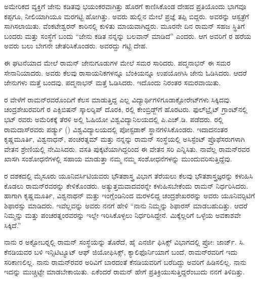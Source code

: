 ಅಮೇರಿಕದ ವ್ಯಕ್ತಿಗೆ ಜೇನು ಕಡಿತವು ಭಯಂಕರವಾಗಿತ್ತು ಹೊರಗೆ ಕಾಣಿಸಿಕೊಂಡ ದೇಹದ ಪ್ರತಿಯೊಂದು ಭಾಗವೂ ಕಪ್ಪಗೂ, ನೀಲಿಯಾಗಿಯೂ ಮರಗಟ್ಟಿ ಹೋಗಿತ್ತು. ಅವರು ಹುಲ್ಲಿನ ಮೇಲೆ ಪ್ರಜ್ಞೆ ತಪ್ಪಿ ಬಿದ್ದರು. ಅವರನ್ನು ಆಸ್ಪತ್ರೆಗೆ ಸಾಗಿಸಲಾಯಿತು. ವೆಂಕಟೇಶ್ವರನ್ ಕಾರಿನಲ್ಲಿ ಕುಳಿತು ಮಾಯವಾಗಿದ್ದರು. ಮೂರನೇ ದಿನ ರಾಮನ್ ಸಹಜ ಸ್ಥಿತಿಗೆ ಬಂದರು ಮತ್ತು ಸಂಸ್ಥೆಗೆ ಬಂದು “ಜೇನು ಕಡಿತ ನನ್ನನ್ನು ಬಲವಾನ್ ಮಾಡಿದೆ” ಎಂದರು. ಆಗ ಅವರಿಗೆ ರ ಹರೆಯ ಅವರು ಬಲು ಬೇಗನೇ ಚೇತರಿಸಿಕೊಂಡರು. ಅವರದ್ದು ಗಟ್ಟಿ ದೇಹ.

ಈ ಘಟನೆಯಾದ ಮೇಲೆ ರಾಮನ್ ಜೇನುಗೂಡುಗಳ ಮೇಲೆ ಸಮರ ಸಾರಿದರು. ಪದ್ಮನಾಭನ್ ಈ ಸಮರ ಸೇನಾನಿಯಾದರು. ಅವರು ಕೆಲವು ರಾಸಾಯನಿಕಗಳನ್ನೂ ಬೆಂಕಿಯನ್ನೂ ಉಪಯೋಗಿಸಿ ಜೇನು ಓಡಿಸಿದರು. ಆದರೆ ಜೇನುಗಳು ಮತ್ತೆ ಬಂದವು. ಪದ್ಮನಾಭನ್ ಮತ್ತೆ ಓಡಿಸಿದರು. ಇದೊಂದು ನಿರಂತರ ಸಮರವಾಯಿತು.



ರ ವೇಳೆಗೆ ರಾಮನ್‍ರವರೊಂದಿಗೆ ಕೆಲಸ ಮಾಡುತ್ತಿದ್ದ ಎಲ್ಲ ವಿದ್ಯಾರ್ಥಿಗಳಿಗೂ\break ಡಾಕ್ಟೋರೇಟ್‍ಗಳು ಸಿಕ್ಕಿದವು. ಚಂದ್ರಶೇಖರವರಿಗೆ ರ ಎಕ್ಸಿಬಿಷನ್ ಸ್ಕಾಲರ್‍ಶಿಪ್ ದೊರಕಿ, ರಲ್ಲಿ ಕೇಂಬ್ರಿಡ್ಜ್‌ಗೆ ಹೊರಟರು. ಫುಲ್‍ಬ್ರೈಟ್ ಗ್ರಾಂಟ್‍ನಲ್ಲಿ ಭಟ್ ರವರು ಅಮೆರಿಕಕ್ಕೆ ತೆರಳಿ ಅಲ್ಲಿ ಓಹಿಯೋ ವಿಶ್ವವಿದ್ಯಾನಿಲಯದಲ್ಲಿ ಪಿ.ಎಚ್.ಡಿ. ಪಡೆದರು. ರಲ್ಲಿ ರಾಮದಾಸ್‍ರವರು ಪರ್ಡ್ಯು () ವಿಶ್ವವಿದ್ಯಾಲಯದಲ್ಲಿ ಪೋಸ್ಟಡಾಕ್ ಸ್ಥಾನಗಳಿಸಿಕೊಂಡರು. ಇದಾದನಂತರ ಕೃಷ್ಣಮೂರ್ತಿ, ವಿಶ್ವನಾಧನ್, ಪಂಚರತ್ನಮ್ ಮತ್ತು ನನ್ನನ್ನು ರಾಮನ್ ಸಂಸ್ಥೆಯಲ್ಲಿ ಅಸಿಸ್ಟೆಂಟ್ ಪ್ರೊಫೆಸರುಗಳಾಗಿ  ವೇತನ ಶ್ರೇಣಿಯಲ್ಲಿ ನೇಮಿಸಿದರು. ವಸತಿ ಪುಕ್ಕಟೆಯಾಗಿದ್ದರಿಂದ ಈ ವೇತನ ಸರಿ ಎನ್ನಿಸಿತು. ನಾವೆಲ್ಲ ರಾಮನ್‍ರವರ ಖಾಸಗಿ ಸಂಶೋಧನೆಗಳಲ್ಲಿ ಸಹಾಯ ಮಾಡುತ್ತಾ ನಮ್ಮ ನಮ್ಮ ಸಂಶೋಧನೆಗಳನ್ನು ಮುಂದುವರಿಸುತ್ತಿದ್ದೆವು.

ರ ದಶಕದಲ್ಲಿ ಮೈಸೂರು ಯೂನಿವರ್ಸಿಟಿಯವರು ಭೌತಶಾಸ್ತ್ರ ವಿಭಾಗ ತೆರೆಯಲು ಕೆಲವು ಭೌತಶಾಸ್ತ್ರಜ್ಞರನ್ನು ಕಳುಹಿಸಿ ಕೊಡಲು ರಾಮನ್‍ರವರನ್ನು ಕೇಳಿಕೊಂಡರು. ಅತ್ಯುತ್ತಮವಾದವರನ್ನೇ ಕಳುಹಿಸಬೇಕೆಂದು ರಾಮನ್ ನಿರ್ಧರಿಸಿದರು. ಹಾಗಾಗಿ ಕೃಷ್ಣಮೂರ್ತಿ, ವಿಶ್ವನಾಥನ್ ಮತ್ತು ಇಂಗ್ಲೆಂಡಿನಿಂದ ಮರಳಲಿದ್ದ ಚಂದ್ರಶೇಖರರನ್ನು ಅವರು ಯೂನಿವರ್‍ಸಿಟಿಗೆ ಶಿಫಾರಸ್ಸು ಮಾಡಿದರು. ಇವೆಲ್ಲವನ್ನು ಅವರು ನನಗೆ ಹೇಳಿ “ನಾನು ನಿಮ್ಮನ್ನು ಶಿಫಾರಸ್ ಮಾಡಬಹುದಿತ್ತು. ಆದರೆ ನಿಮ್ಮನ್ನು ಮತ್ತು ಪಂಚರತ್ನಂರವರನ್ನು ಇಲ್ಲೇ ಇರಿಸಿಕೊಳ್ಳಲು ನಿರ್ಧರಿಸಿದ್ದೇನೆ. ಮಿಕ್ಕೆಲ್ಲರಿಗೆ ಒಳ್ಳೆಯ ಅವಕಾಶವೇ ಸಿಕ್ಕಿದೆ.”

ನಾನು ರ ಅಕ್ಟೋಬರ್‍ನಲ್ಲಿ ರಾಮನ್ ಸಂಸ್ಥೆಯನ್ನು ತೊರೆದೆ, ಹೈ ಎನರ್ಜಿ ಫಿಸಿಕ್ಸ್ ವಿಭಾಗದಲ್ಲಿ ಪ್ರೋ: ಜಾರ್ಜ್. ಸಿ. ಕೆನಡಿಯವರ ಬಳಿ ಇನ್ಸಿಟಿಟ್ಯೂಟ್ ಆಫ್ ಜಿಯೋಫಿಸಿಕ್ಸ್, ಕ್ಯಾಲಿಫೊರ್ನಿಯಾಗೆ ಬಂದೆ, ರಾಮನ್‍ರವರಿಗೆ ಇದು ಸರಿಕಾಣಲಿಲ್ಲ. ನಾನು ರಾಮನ್‍ರವರ ಅರಿವಿಗೆ ಬಾರದಂತೆ ಕೆನಡಿಯವರಿಗೆ ಬರೆದಿದ್ದು ಅವರಿಗೆ ಹಿಡಿಸಲಿಲ್ಲ. ನಾನು ಇದನ್ನು ಮುಚ್ಚಿಟ್ಟೇ ಮಾಡಬೇಕಾಯಿತು. ಏಕೆಂದರೆ ರಾಮನ್ ಹೇಗೆ ಪ್ರತಿಕ್ರಿಯುಸುತ್ತಿದ್ದರೆಂಬುದು ನನಗೆ ತಿಳಿದಿತ್ತು.

